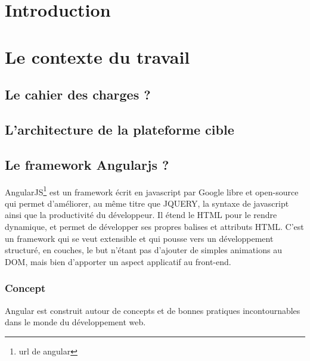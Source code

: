 \documentclass[a4paper,11pt]{report}
\begin{document}
\chapter{Introduction}


\chapter{Le contexte du travail}
\section{Le cahier des charges ?}
\section{L'architecture de la plateforme cible}
\section{Le framework Angularjs ?}

AngularJS\footnote{url de angular} est un framework écrit en javascript par Google libre et
open-source qui permet d'améliorer, au même titre que JQUERY, la
syntaxe de javascript ainsi que la productivité du
développeur. Il étend le HTML pour le rendre dynamique, et permet de
développer ses propres balises et attributs HTML. C’est un framework
qui se veut extensible et qui pousse vers un développement structuré, 
en couches, le but n’étant pas d’ajouter de simples animations au DOM,
mais bien d’apporter un aspect applicatif au front-end.


\subsection{Concept}
Angular est construit autour de concepts et de bonnes pratiques
incontournables dans le monde du développement web.
\end{document}
